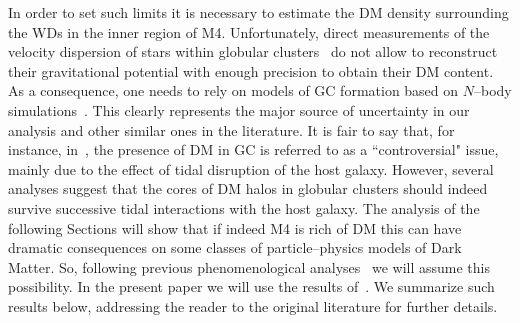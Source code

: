 \documentclass[11pt]{article}
\begin{document}
In order to set such limits it is necessary to estimate the DM density surrounding the WDs in the 
inner region of M4. Unfortunately, direct measurements of the velocity dispersion of stars within globular clusters~\cite{dm_upper_bounds_in_gc_2022} do not allow to reconstruct their gravitational potential with enough precision to obtain their DM content. As a consequence, one needs to rely on models of GC formation based on $N$--body simulations~\cite{dm_in_gc_2005,idm_wd_2010}. This clearly represents the major source of uncertainty in our analysis and other similar ones in the literature. It is fair to say that, for instance, in~\cite{dm_stars_Bertone2007}, the presence of DM in GC is referred to as a ``controversial" issue, mainly due to the effect of tidal disruption of the host galaxy. However, several analyses suggest that the cores of DM halos in globular clusters should indeed survive successive tidal interactions with the host galaxy. The analysis of the following Sections will show that if indeed M4 is rich of DM this can have dramatic consequences on some classes of particle--physics models of Dark Matter. So, following previous phenomenological analyses~\cite{idm_wd_2010, dm_cap_WD_Dasgupta2019, improved_WD_2021} we will assume this possibility.  In the present paper we will use the results of~\cite{idm_wd_2010}. We summarize such results below, addressing the reader to the original literature for further details.
\end{document}
